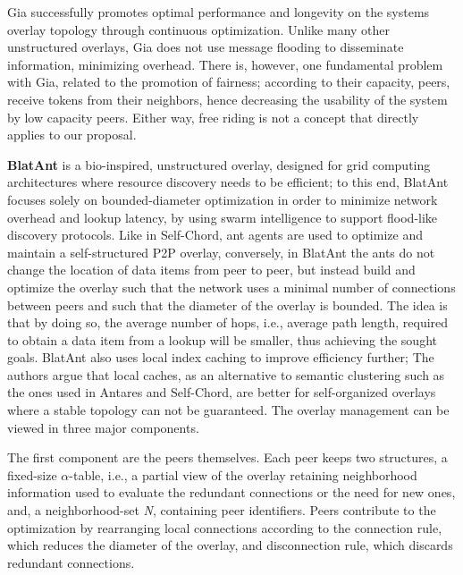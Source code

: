 \documentclass[runningheads]{llncs}
\begin{document}
Gia successfully promotes optimal performance and longevity on the systems overlay topology through continuous optimization. Unlike many other unstructured overlays, Gia does not use message flooding to disseminate information, minimizing overhead. There is, however, one fundamental problem with Gia, related to the promotion of fairness; according to their capacity, peers, receive tokens from their neighbors, hence decreasing the usability of the system by low capacity peers. Either way, free riding is not a concept that directly applies to our proposal.\newline

\textbf{BlatAnt} \cite{blatant} is a bio-inspired, unstructured overlay, designed for grid computing architectures where resource discovery needs to be efficient; to this end, BlatAnt focuses solely on bounded-diameter optimization in order to minimize network overhead and lookup latency, by using swarm intelligence to support flood-like discovery protocols. Like in Self-Chord\cite{selfchord}, ant agents are used to optimize and maintain a self-structured P2P overlay, conversely, in BlatAnt the ants do not change the location of data items from peer to peer, but instead build and optimize the overlay such that the network uses a minimal number of connections between peers and such that the diameter of the overlay is bounded. The idea is that by doing so, the average number of hops, i.e., average path length, required to obtain a data item from a lookup will be smaller, thus achieving the sought goals. BlatAnt also uses local index caching to improve efficiency further; The authors argue that local caches,  as an alternative to semantic clustering such as the ones used in Antares\cite{antares} and Self-Chord, are better for self-organized overlays where a stable topology can not be guaranteed. The overlay management can be viewed in three major components.

The first component are the peers themselves. Each peer keeps two structures, a   fixed-size $\alpha$-table, i.e., a partial view of the overlay retaining neighborhood information used to evaluate the redundant connections or the need for new ones, and, a neighborhood-set \textit{N}, containing peer identifiers. Peers contribute to the optimization by rearranging local connections according to the connection rule, which reduces the diameter of the overlay, and disconnection rule, which discards redundant connections.
\end{document}
